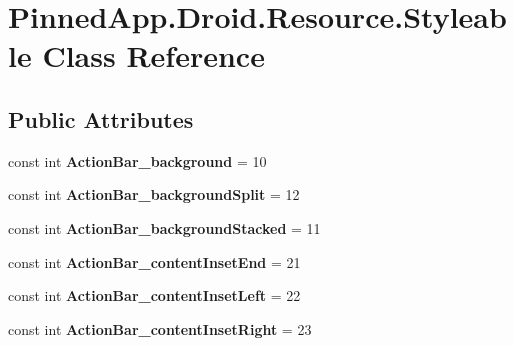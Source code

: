 \hypertarget{class_pinned_app_1_1_droid_1_1_resource_1_1_styleable}{}\section{Pinned\+App.\+Droid.\+Resource.\+Styleable Class Reference}
\label{class_pinned_app_1_1_droid_1_1_resource_1_1_styleable}
\subsection*{Public Attributes}
\begin{DoxyCompactItemize}
\item 
\mbox{\label{class_pinned_app_1_1_droid_1_1_resource_1_1_styleable_a682a9c5d2835a118afd7956e7ed207c8}} 
const int {\bfseries Action\+Bar\+\_\+background} = 10
\item 
\mbox{\label{class_pinned_app_1_1_droid_1_1_resource_1_1_styleable_a09121b8418dced3b4302ecef398f7e0b}} 
const int {\bfseries Action\+Bar\+\_\+background\+Split} = 12
\item 
\mbox{\label{class_pinned_app_1_1_droid_1_1_resource_1_1_styleable_a937b7023e20ef5ee9ad8b1cc3cf6f618}} 
const int {\bfseries Action\+Bar\+\_\+background\+Stacked} = 11
\item 
\mbox{\label{class_pinned_app_1_1_droid_1_1_resource_1_1_styleable_a11553d5573b446742c030fa06b3e0d6f}} 
const int {\bfseries Action\+Bar\+\_\+content\+Inset\+End} = 21
\item 
\mbox{\label{class_pinned_app_1_1_droid_1_1_resource_1_1_styleable_a6e30a5e732a165bf8227c3e2e9446409}} 
const int {\bfseries Action\+Bar\+\_\+content\+Inset\+Left} = 22
\item 
\mbox{\label{class_pinned_app_1_1_droid_1_1_resource_1_1_styleable_a1d13e1569fcba6b79276374f21eca583}} 
const int {\bfseries Action\+Bar\+\_\+content\+Inset\+Right} = 23

\end{DoxyCompactItemize}
